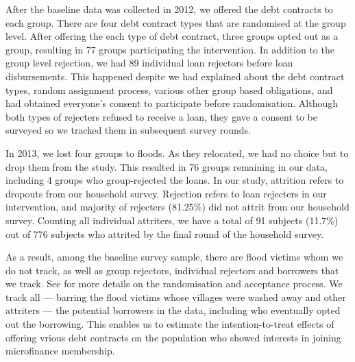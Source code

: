 	After the baseline data was collected in 2012, we offered the debt contracts to each group. There are four debt contract types that are randomised at the group level. After offering the each type of debt contract, three groups opted out as a group, resulting in 77 groups participating the intervention. In addition to the group level rejection, we had 89 individual loan rejectors before loan disbursements. This happened despite we had explained about the debt contract types, random assignment process, various other group based obligations, and had obtained everyone's consent to participate before randomisation. Although both types of rejecters refused to receive a loan, they gave a consent to be surveyed so we tracked them in subsequent survey rounds.



	In 2013, we lost four groups to floods. As they relocated, we had no choice but to drop them from the study. This resulted in 76 groups remaining in our data, including 4 groups who group-rejected the loans. In our study, attrition refers to dropouts from our household survey. Rejection refers to loan rejecters in our intervention, and majority of rejecters (81.25\%) did not attrit from our household survey. Counting all individual attriters, we have a total of 91 subjects (11.7\%) out of 776 subjects who attrited by the final round of the household survey. 

	As a result, among the baseline survey sample, there are flood victims whom we do not track, as well as group rejectors, individual rejectors and borrowers that we track. See \citet{GUK2016} for more details on the randomisation and acceptance process. We track all --- barring the flood victims whose villages were washed away and other attriters --- the potential borrowers in the data, including who eventually opted out the borrowing. This enables us to estimate the intention-to-treat effects of offering vrious debt contracts on the population who showed interests in joining microfinance membership. 

